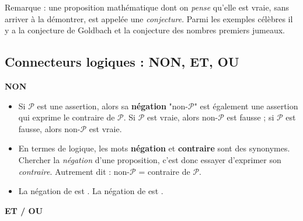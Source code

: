 \documentclass[11pt,class=report,crop=false]{standalone}
\begin{document}
Remarque : une proposition mathématique dont on \textit{pense} qu'elle est vraie, sans arriver à la démontrer, est appelée une \textit{conjecture}. Parmi les exemples célèbres il y a la conjecture de Goldbach et la conjecture des nombres premiers jumeaux.

  
\subsection*{Connecteurs logiques : NON, ET, OU}

\textbf{NON}

\begin{itemize}
    \item Si $\mathcal{P}$ est une assertion, alors sa \textbf{négation} "non-$\mathcal{P}$" est également une assertion qui exprime le contraire de $\mathcal{P}$. Si $\mathcal{P}$ est vraie, alors non-$\mathcal{P}$ est fausse ; si $\mathcal{P}$ est fausse, alors non-$\mathcal{P}$ est vraie.
    
    \item En termes de logique, les mots \textbf{négation} et \textbf{contraire} sont des synonymes. Chercher la \textit{négation} d'une proposition, c'est donc essayer d'exprimer son \textit{contraire}.
    Autrement dit :  non-$\mathcal{P}$ = contraire de $\mathcal{P}$.
    
    \item La négation de  est . La négation de  est .
\end{itemize}

\bigskip

\textbf{ET / OU}
\end{document}
